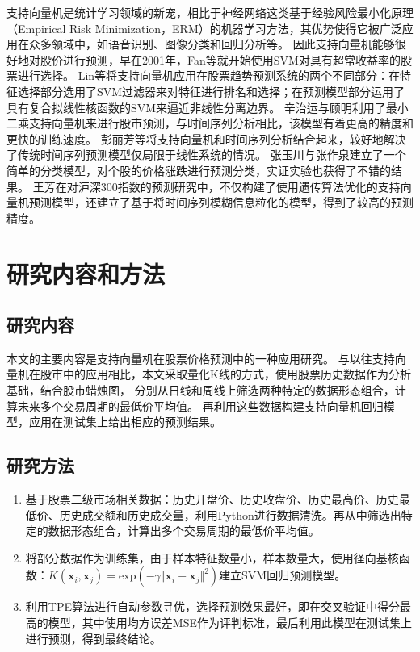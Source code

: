 支持向量机是统计学习领域的新宠，相比于神经网络这类基于经验风险最小化原理（Empirical Risk Minimization，ERM）的机器学习方法，其优势使得它被广泛应用在众多领域中，如语音识别\cite{en4}、图像分类\cite{en5}和回归分析\cite{cn16}等。
因此支持向量机能够很好地对股价进行预测，早在2001年，Fan等就开始使用SVM对具有超常收益率的股票进行选择\cite{en6}。
Lin等将支持向量机应用在股票趋势预测系统的两个不同部分：在特征选择部分选用了SVM过滤器来对特征进行排名和选择；在预测模型部分运用了具有复合拟线性核函数的SVM来逼近非线性分离边界\cite{en7}。
辛治运与顾明利用了最小二乘支持向量机来进行股市预测，与时间序列分析相比，该模型有着更高的精度和更快的训练速度\cite{cn17}。
彭丽芳等将支持向量机和时间序列分析结合起来，较好地解决了传统时间序列预测模型仅局限于线性系统的情况\cite{cn18}。
张玉川与张作泉建立了一个简单的分类模型，对个股的价格涨跌进行预测分类，实证实验也获得了不错的结果\cite{cn19}。
王芳在对沪深300指数的预测研究中，不仅构建了使用遗传算法优化的支持向量机预测模型，还建立了基于将时间序列模糊信息粒化的模型，得到了较高的预测精度\cite{cn20}。

\section{研究内容和方法}

\subsection{研究内容}

本文的主要内容是支持向量机在股票价格预测中的一种应用研究。
与以往支持向量机在股市中的应用相比，本文采取量化K线的方式，使用股票历史数据作为分析基础，结合股市蜡烛图，
分别从日线和周线上筛选两种特定的数据形态组合，计算未来多个交易周期的最低价平均值。
再利用这些数据构建支持向量机回归模型，应用在测试集上给出相应的预测结果。

\subsection{研究方法}

\begin{enumerate}
    \item 基于股票二级市场相关数据：历史开盘价、历史收盘价、历史最高价、历史最低价、历史成交额和历史成交量，利用Python进行数据清洗。再从中筛选出特定的数据形态组合，计算出多个交易周期的最低价平均值。
    \item 将部分数据作为训练集，由于样本特征数量小，样本数量大，使用径向基核函数：$K(\mathbf{x}_i,\mathbf{x}_j)=\mathrm{exp}(-\gamma\Vert\mathbf{x}_i-\mathbf{x}_j\Vert^2)$建立SVM回归预测模型。
    \item 利用TPE算法进行自动参数寻优，选择预测效果最好，即在交叉验证中得分最高的模型，其中使用均方误差MSE作为评判标准，最后利用此模型在测试集上进行预测，得到最终结论。
\end{enumerate}